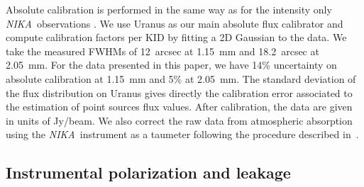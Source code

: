 \documentclass[twocolumn, traditabstract]{aa}
\newcommand{\nika}{{\it NIKA}}
\begin{document}
Absolute calibration is performed in the same way as for the intensity only
\nika\ observations \citep{adam2014,catalano2014}. We use Uranus as our main
absolute flux calibrator and compute calibration factors per KID by fitting a 2D
Gaussian to the data. We take the measured FWHMs of 12~arcsec at 1.15~mm and
18.2~arcsec at 2.05~mm. For the data presented in this paper, we have 14\% uncertainty on
absolute calibration at 1.15~mm and 5\% at 2.05~mm.  
The standard deviation of the flux distribution on Uranus gives directly the calibration 
error associated to the estimation of point sources flux values.
After calibration, the data
are given in units of Jy/beam.  We also correct the raw data from atmospheric
absorption using the \nika\ instrument as a taumeter following the procedure
described in~\cite{catalano2014}. 

\subsection{Instrumental polarization and leakage}
\label{sec:polleak}
\end{document}
